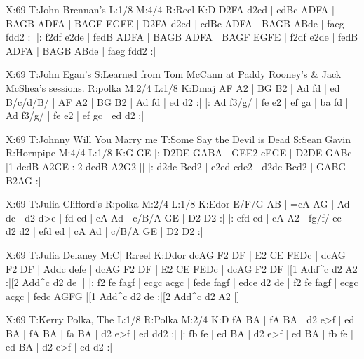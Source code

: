 \documentclass[letterpaper]{article}
\begin{document}
\begin{abc}[name]
X:69
T:John Brennan's
L:1/8
M:4/4
R:Reel
K:D
D2FA d2ed | cdBc ADFA | BAGB ADFA | BAGF EGFE |
D2FA d2ed | cdBc ADFA | BAGB ABde | faeg fdd2 :|
|: f2df e2de | fedB ADFA | BAGB ADFA | BAGF EGFE |
f2df e2de | fedB ADFA | BAGB ABde | faeg fdd2 :|
\end{abc}

\begin{abc}[name]
X:69
T:John Egan's
S:Learned from Tom McCann at Paddy Rooney's & Jack McShea's sessions.
R:polka
M:2/4
L:1/8
K:Dmaj
AF A2 | BG B2 | Ad fd | ed B/c/d/B/ |
AF A2 | BG B2 | Ad fd | ed d2 :|
|: Ad f3/g/ | fe e2 | ef ga | ba fd |
Ad f3/g/ | fe e2 | ef gc | ed d2 :|
\end{abc}

\begin{abc}[name]
X:69
T:Johnny Will You Marry me
T:Some Say the Devil is Dead
S:Sean Gavin
R:Hornpipe
M:4/4
L:1/8
K:G
GE |: D2DE GABA | GEE2 cEGE | D2DE GABc |1 dedB A2GE :|2 dedB A2G2 ||
|: d2dc Bcd2 | e2ed cde2 | d2dc Bcd2 | GABG B2AG :|
\end{abc}

\begin{abc}[name]
X:69
T:Julia Clifford's
R:polka
M:2/4
L:1/8
K:Edor
E/F/G AB | =cA AG | Ad dc | d2 d>e |
fd ed | cA Ad | c/B/A GE | D2 D2 :|
|: {e}fd ed | cA A2 | fg/f/ ec | d2 d2 |
{e}fd ed | cA Ad | c/B/A GE | D2 D2 :|
\end{abc}

\begin{abc}[name]
X:69
T:Julia Delaney
M:C|
R:reel
K:Ddor
dcAG F2 DF | E2 CE FEDc | dcAG F2 DF | Addc defe |
dcAG F2 DF | E2 CE FEDc | dcAG F2 DF |[1 Add^c d2 A2 :|[2 Add^c d2 de |]
|: f2 fe fagf | ecgc acgc | fede fagf | edce d2 de |
f2 fe fagf | ecgc acgc | fedc AGFG |[1 Add^c d2 de :|[2 Add^c d2 A2 |]
\end{abc}

\begin{abc}[name]
X:69
T:Kerry Polka, The
L:1/8
R:Polka
M:2/4
K:D
fA BA | fA BA | d2 e>f | ed BA |
fA BA | fa BA | d2 e>f | ed dd2 :|
|: fb fe | ed BA | d2 e>f | ed BA |
fb fe | ed BA | d2 e>f | ed d2 :|
\end{abc}
\end{document}
